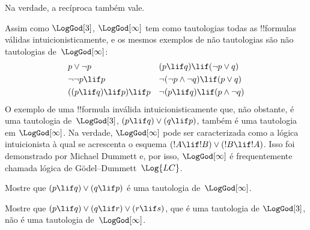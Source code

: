 \documentclass[../../../include/open-logic-section]{subfiles}
\begin{document}
Na verdade, a recíproca também vale.

Assim como $\LogGod[3]$, $\LogGod[\infty]$ tem como tautologias todas
as !!{formula}s válidas intuicionisticamente, e os mesmos exemplos de
não tautologias são não tautologias de~$\LogGod[\infty]$:
\begin{align*}
  & p \lor \lnot p && (p \lif q) \lif (\lnot p \lor q) \\
  & \lnot\lnot p \lif p && \lnot(\lnot p \land \lnot q) \lif (p \lor q) \\
  & ((p \lif q) \lif p) \lif p && \lnot(p \lif q) \lif (p \land \lnot q)
\end{align*}
O exemplo de uma !!{formula} inválida intuicionisticamente que, não
obstante, é uma tautologia de~$\LogGod[3]$,
$(p \lif q) \lor (q \lif p)$, também é uma tautologia em
$\LogGod[\infty]$. Na verdade, $\LogGod[\infty]$ pode ser
caracterizada como a lógica intuicionista à qual se acrescenta o
esquema $(!A \lif !B) \lor (!B \lif !A)$. Isso foi demonstrado por
Michael Dummett e, por isso, $\LogGod[\infty]$ é frequentemente chamada
lógica de G\"odel--Dummett~$\Log{LC}$.

\begin{prob}
  Mostre que $(p \lif q) \lor (q \lif p)$ é uma
  tautologia de~$\LogGod[\infty]$.
\end{prob}

\begin{prob}
  Mostre que $(p \lif q) \lor (q \lif r) \lor (r \lif s)$, que é
  uma tautologia de $\LogGod[3]$, não é uma tautologia
  de~$\LogGod[\infty]$.
\end{prob}
\end{document}
